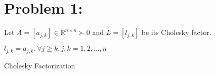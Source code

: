 \newpage
\section*{Problem 1:}
Let $A = [a_{j,k}] \in \mathbb{R}^{n\times n} \succ 0$ and $L = [l_{j,k}]$ be its Cholesky factor. 

\begin{algorithm}[H]
\SetAlgoLined
{}
 $l_{j,k} = a_{j,k}, \forall j\geq k, j,k= 1,2, \ldots, n$ \;
 \caption{Cholesky Factorization}
\end{algorithm}